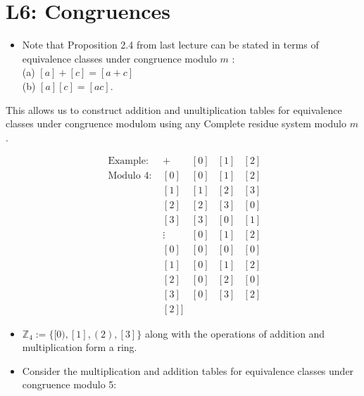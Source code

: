 \documentclass[10pt]{article}
\begin{document}
\section*{L6: Congruences}
\begin{itemize}
  \item Note that Proposition 2.4 from last lecture can be stated in terms of equivalence classes under congruence modulo $m$ :\\
(a) $[a]+[c]=[a+c]$\\
(b) $[a][c]=[a c]$.
\end{itemize}

This allows us to construct addition and unultiplication tables for equivalence classes under congruence modulom using any Complete residue system modulo $m$.

$$
\begin{array}{ll|lll}
\text { Example: } & + & {[0]} & {[1]} & {[2]} \\
\hline \text { Modulo 4: } & {[0]} & {[0]} & {[1]} & {[2]} \\
& {[1]} & {[1]} & {[2]} & {[3]} \\
& {[2]} & {[2]} & {[3]} & {[0]} \\
& {[3]} & {[3]} & {[0]} & {[1]} \\
& \vdots & {[0]} & {[1]} & {[2]} \\
& {[0]} & {[0]} & {[0]} & {[0]} \\
& {[1]} & {[0]} & {[1]} & {[2]} \\
& {[2]} & {[0]} & {[2]} & {[0]} \\
& {[3]} & {[0]} & {[3]} & {[2]} \\
& [2]]
\end{array}
$$

\begin{itemize}
  \item $\mathbb{Z}_{4}:=\{[0),[1],(2),[3]\}$ along with the operations of addition and multiplication form a ring.
  \item Consider the multiplication and addition tables for equivalence classes under congruence modulo 5:
\end{itemize}
\end{document}
